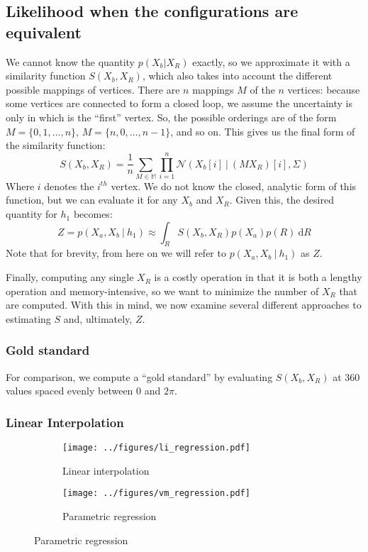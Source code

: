 \documentclass{article} %
\begin{document}
\subsection{Likelihood when the configurations are equivalent}

We cannot know the quantity $p(X_b\vert X_R)$ exactly, so we
approximate it with a similarity function $S(X_b, X_R)$, which also
takes into account the different possible mappings of vertices. There
are $n$ mappings $M$ of the $n$ vertices: because some vertices are
connected to form a closed loop, we assume the uncertainty is only in
which is the ``first'' vertex. So, the possible orderings are of the
form $M=\lbrace{}0, 1, \ldots{}, n\rbrace{}$, $M=\lbrace{}n, 0,
\ldots{}, n-1\rbrace{}$, and so on. This gives us the final form of
the similarity function:
\begin{equation}
  S(X_b, X_R)=\frac{1}{n}\sum_{M\in\mathbb{M}}\prod_{i=1}^n\mathcal{N}(X_b[i]\ \vert \ (MX_R)[i], \Sigma)
\end{equation}
Where $i$ denotes the $i^{th}$ vertex. We do not know the closed,
analytic form of this function, but we can evaluate it for any $X_b$
and $X_R$. Given this, the desired quantity for $h_1$ becomes:
\begin{equation}
  Z = p(X_a,X_b\ \vert \ h_1)\approx \int_R S(X_b, X_R)p(X_a)p(R)\ \mathrm{d}R
\end{equation}
Note that for brevity, from here on we will refer to $p(X_a, X_b\
\vert \ h_1)$ as $Z$.

Finally, computing any single $X_R$ is a costly operation in that it
is both a lengthy operation and memory-intensive, so we want to
minimize the number of $X_R$ that are computed. With this in mind, we
now examine several different approaches to estimating $S$ and,
ultimately, $Z$.

\subsubsection{Gold standard}

For comparison, we compute a ``gold standard'' by evaluating $S(X_b,
X_R)$ at 360 values spaced evenly between $0$ and $2\pi$.

\subsubsection{Linear Interpolation}

\begin{figure}[t]
  \centering
  \begin{subfigure}[b]{0.45\textwidth}
    \centering
    \texttt{[image: ../figures/li\_regression.pdf]}
    \caption{Linear interpolation}
    \label{fig:li}
  \end{subfigure}
  \begin{subfigure}[b]{0.45\textwidth}
    \centering
    \texttt{[image: ../figures/vm\_regression.pdf]}
    \caption{Parametric regression}
    \label{fig:vm}
  \end{subfigure}
\end{figure}
\end{document}
